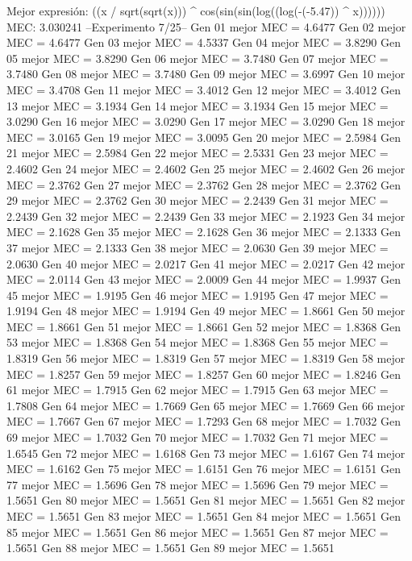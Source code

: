 Mejor expresión: ((x / sqrt(sqrt(x))) ^ cos(sin(sin(log((log(-(-5.47)) ^ x))))))
MEC: 3.030241
--Experimento 
 7/25--
Gen 01 mejor MEC = 4.6477
Gen 02 mejor MEC = 4.6477
Gen 03 mejor MEC = 4.5337
Gen 04 mejor MEC = 3.8290
Gen 05 mejor MEC = 3.8290
Gen 06 mejor MEC = 3.7480
Gen 07 mejor MEC = 3.7480
Gen 08 mejor MEC = 3.7480
Gen 09 mejor MEC = 3.6997
Gen 10 mejor MEC = 3.4708
Gen 11 mejor MEC = 3.4012
Gen 12 mejor MEC = 3.4012
Gen 13 mejor MEC = 3.1934
Gen 14 mejor MEC = 3.1934
Gen 15 mejor MEC = 3.0290
Gen 16 mejor MEC = 3.0290
Gen 17 mejor MEC = 3.0290
Gen 18 mejor MEC = 3.0165
Gen 19 mejor MEC = 3.0095
Gen 20 mejor MEC = 2.5984
Gen 21 mejor MEC = 2.5984
Gen 22 mejor MEC = 2.5331
Gen 23 mejor MEC = 2.4602
Gen 24 mejor MEC = 2.4602
Gen 25 mejor MEC = 2.4602
Gen 26 mejor MEC = 2.3762
Gen 27 mejor MEC = 2.3762
Gen 28 mejor MEC = 2.3762
Gen 29 mejor MEC = 2.3762
Gen 30 mejor MEC = 2.2439
Gen 31 mejor MEC = 2.2439
Gen 32 mejor MEC = 2.2439
Gen 33 mejor MEC = 2.1923
Gen 34 mejor MEC = 2.1628
Gen 35 mejor MEC = 2.1628
Gen 36 mejor MEC = 2.1333
Gen 37 mejor MEC = 2.1333
Gen 38 mejor MEC = 2.0630
Gen 39 mejor MEC = 2.0630
Gen 40 mejor MEC = 2.0217
Gen 41 mejor MEC = 2.0217
Gen 42 mejor MEC = 2.0114
Gen 43 mejor MEC = 2.0009
Gen 44 mejor MEC = 1.9937
Gen 45 mejor MEC = 1.9195
Gen 46 mejor MEC = 1.9195
Gen 47 mejor MEC = 1.9194
Gen 48 mejor MEC = 1.9194
Gen 49 mejor MEC = 1.8661
Gen 50 mejor MEC = 1.8661
Gen 51 mejor MEC = 1.8661
Gen 52 mejor MEC = 1.8368
Gen 53 mejor MEC = 1.8368
Gen 54 mejor MEC = 1.8368
Gen 55 mejor MEC = 1.8319
Gen 56 mejor MEC = 1.8319
Gen 57 mejor MEC = 1.8319
Gen 58 mejor MEC = 1.8257
Gen 59 mejor MEC = 1.8257
Gen 60 mejor MEC = 1.8246
Gen 61 mejor MEC = 1.7915
Gen 62 mejor MEC = 1.7915
Gen 63 mejor MEC = 1.7808
Gen 64 mejor MEC = 1.7669
Gen 65 mejor MEC = 1.7669
Gen 66 mejor MEC = 1.7667
Gen 67 mejor MEC = 1.7293
Gen 68 mejor MEC = 1.7032
Gen 69 mejor MEC = 1.7032
Gen 70 mejor MEC = 1.7032
Gen 71 mejor MEC = 1.6545
Gen 72 mejor MEC = 1.6168
Gen 73 mejor MEC = 1.6167
Gen 74 mejor MEC = 1.6162
Gen 75 mejor MEC = 1.6151
Gen 76 mejor MEC = 1.6151
Gen 77 mejor MEC = 1.5696
Gen 78 mejor MEC = 1.5696
Gen 79 mejor MEC = 1.5651
Gen 80 mejor MEC = 1.5651
Gen 81 mejor MEC = 1.5651
Gen 82 mejor MEC = 1.5651
Gen 83 mejor MEC = 1.5651
Gen 84 mejor MEC = 1.5651
Gen 85 mejor MEC = 1.5651
Gen 86 mejor MEC = 1.5651
Gen 87 mejor MEC = 1.5651
Gen 88 mejor MEC = 1.5651
Gen 89 mejor MEC = 1.5651

